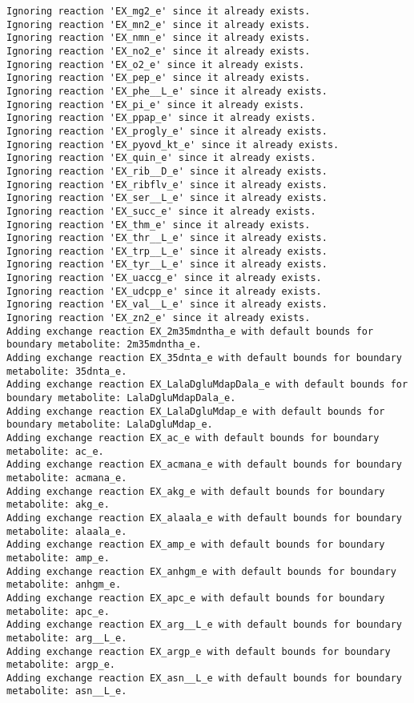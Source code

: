 \documentclass[
  letterpaper,
  DIV=11,
  numbers=noendperiod]{scrartcl}
\begin{document}
\begin{verbatim}
Ignoring reaction 'EX_mg2_e' since it already exists.
Ignoring reaction 'EX_mn2_e' since it already exists.
Ignoring reaction 'EX_nmn_e' since it already exists.
Ignoring reaction 'EX_no2_e' since it already exists.
Ignoring reaction 'EX_o2_e' since it already exists.
Ignoring reaction 'EX_pep_e' since it already exists.
Ignoring reaction 'EX_phe__L_e' since it already exists.
Ignoring reaction 'EX_pi_e' since it already exists.
Ignoring reaction 'EX_ppap_e' since it already exists.
Ignoring reaction 'EX_progly_e' since it already exists.
Ignoring reaction 'EX_pyovd_kt_e' since it already exists.
Ignoring reaction 'EX_quin_e' since it already exists.
Ignoring reaction 'EX_rib__D_e' since it already exists.
Ignoring reaction 'EX_ribflv_e' since it already exists.
Ignoring reaction 'EX_ser__L_e' since it already exists.
Ignoring reaction 'EX_succ_e' since it already exists.
Ignoring reaction 'EX_thm_e' since it already exists.
Ignoring reaction 'EX_thr__L_e' since it already exists.
Ignoring reaction 'EX_trp__L_e' since it already exists.
Ignoring reaction 'EX_tyr__L_e' since it already exists.
Ignoring reaction 'EX_uaccg_e' since it already exists.
Ignoring reaction 'EX_udcpp_e' since it already exists.
Ignoring reaction 'EX_val__L_e' since it already exists.
Ignoring reaction 'EX_zn2_e' since it already exists.
Adding exchange reaction EX_2m35mdntha_e with default bounds for boundary metabolite: 2m35mdntha_e.
Adding exchange reaction EX_35dnta_e with default bounds for boundary metabolite: 35dnta_e.
Adding exchange reaction EX_LalaDgluMdapDala_e with default bounds for boundary metabolite: LalaDgluMdapDala_e.
Adding exchange reaction EX_LalaDgluMdap_e with default bounds for boundary metabolite: LalaDgluMdap_e.
Adding exchange reaction EX_ac_e with default bounds for boundary metabolite: ac_e.
Adding exchange reaction EX_acmana_e with default bounds for boundary metabolite: acmana_e.
Adding exchange reaction EX_akg_e with default bounds for boundary metabolite: akg_e.
Adding exchange reaction EX_alaala_e with default bounds for boundary metabolite: alaala_e.
Adding exchange reaction EX_amp_e with default bounds for boundary metabolite: amp_e.
Adding exchange reaction EX_anhgm_e with default bounds for boundary metabolite: anhgm_e.
Adding exchange reaction EX_apc_e with default bounds for boundary metabolite: apc_e.
Adding exchange reaction EX_arg__L_e with default bounds for boundary metabolite: arg__L_e.
Adding exchange reaction EX_argp_e with default bounds for boundary metabolite: argp_e.
Adding exchange reaction EX_asn__L_e with default bounds for boundary metabolite: asn__L_e.

\end{verbatim}
\end{document}
